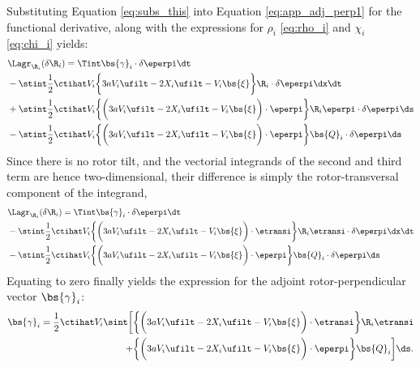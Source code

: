 \noindent Substituting Equation \eqref{eq:subs_this} into Equation \eqref{eq:app_adj_perp1} for the functional derivative, along with the expressions for $\rho_i$ \eqref{eq:rho_i} and $\chi_i$ \eqref{eq:chi_i} yields:
\begin{align}
&\Lagr_{\R_i}(\delta \R_i) = \Tint \bs{\gamma}_i \cdot \delta \eperpi \dt \nonumber\\
& - \stint \frac{1}{2} \ctihat V_i \bigg\{ 3a V_i \ufilt  - 2 X_i \ufilt - V_i\bs{\xi}   \bigg\} \R_i \cdot \delta \eperpi \dx \dt \nonumber \\
& + \stint \frac{1}{2} \ctihat V_i \bigg\{ \bigg(3aV_i \ufilt  -2 X_i \ufilt - V_i\bs{\xi} \bigg) \cdot \eperpi \bigg\} \R_i \eperpi \cdot \delta \eperpi \ds \nonumber \\
& - \stint \frac{1}{2} \ctihat V_i \bigg\{ \bigg(3aV_i \ufilt  -2 X_i \ufilt - V_i\bs{\xi} \bigg) \cdot \eperpi \bigg\} \bs{Q}_i \cdot \delta \eperpi \ds 
\end{align}
Since there is no rotor tilt, and the vectorial integrands of the second and third term are hence two-dimensional, their difference is simply the rotor-transversal component of the integrand, 
\begin{align}
&\Lagr_{\R_i}(\delta \R_i) = \Tint \bs{\gamma}_i \cdot \delta \eperpi \dt \nonumber\\
& - \stint \frac{1}{2} \ctihat V_i \bigg\{ \bigg(3a V_i \ufilt  - 2 X_i \ufilt - V_i\bs{\xi} \bigg) \cdot \etransi   \bigg\} \R_i \etransi \cdot \delta \eperpi \dx \dt \nonumber \\
& - \stint \frac{1}{2} \ctihat V_i \bigg\{ \bigg(3aV_i \ufilt  -2 X_i \ufilt - V_i\bs{\xi} \bigg) \cdot \eperpi \bigg\} \bs{Q}_i \cdot \delta \eperpi \ds 
\end{align}
Equating to zero finally yields the expression for the adjoint rotor-perpendicular vector $\bs{\gamma}_i$:
\begin{align}
\bs{\gamma}_i = \frac{1}{2} \ctihat V_i \sint \bigg[ & \bigg\{ \bigg(3a V_i \ufilt  - 2 X_i \ufilt - V_i\bs{\xi} \bigg) \cdot \etransi   \bigg\} \R_i \etransi   \nonumber\\
  + & \bigg\{ \bigg(3aV_i \ufilt  -2 X_i \ufilt - V_i\bs{\xi} \bigg) \cdot \eperpi \bigg\} \bs{Q}_i \bigg] \ds. \label{eq:app_adj_gamma_final}  
\end{align}


